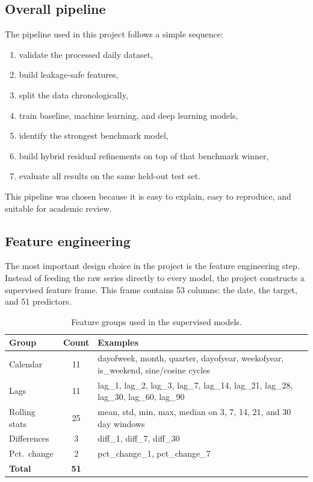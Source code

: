 \documentclass[conference]{IEEEtran}
\begin{document}
\subsection{Overall pipeline}
The pipeline used in this project follows a simple sequence:
\begin{enumerate}
\item validate the processed daily dataset,
\item build leakage-safe features,
\item split the data chronologically,
\item train baseline, machine learning, and deep learning models,
\item identify the strongest benchmark model,
\item build hybrid residual refinements on top of that benchmark winner,
\item evaluate all results on the same held-out test set.
\end{enumerate}

This pipeline was chosen because it is easy to explain, easy to reproduce, and suitable for academic review.

\subsection{Feature engineering}
The most important design choice in the project is the feature engineering step. Instead of feeding the raw series directly to every model, the project constructs a supervised feature frame. This frame contains 53 columns: the date, the target, and 51 predictors.

\begin{table}[t]
\caption{Feature groups used in the supervised models.}
\label{tab:feature_groups}
\centering
\begin{tabular}{p{2.0cm}cp{4.3cm}}
\toprule
\textbf{Group} & \textbf{Count} & \textbf{Examples} \\
\midrule
Calendar & 11 & dayofweek, month, quarter, dayofyear, weekofyear, is\_weekend, sine/cosine cycles \\
Lags & 11 & lag\_1, lag\_2, lag\_3, lag\_7, lag\_14, lag\_21, lag\_28, lag\_30, lag\_60, lag\_90 \\
Rolling stats & 25 & mean, std, min, max, median on 3, 7, 14, 21, and 30 day windows \\
Differences & 3 & diff\_1, diff\_7, diff\_30 \\
Pct.\ change & 2 & pct\_change\_1, pct\_change\_7 \\
\midrule
\textbf{Total} & \textbf{51} &  \\
\bottomrule
\end{tabular}
\end{table}
\end{document}
